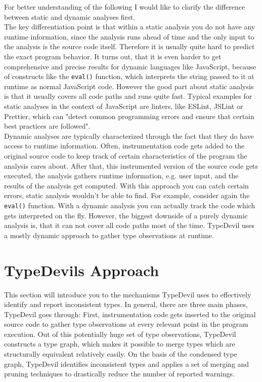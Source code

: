 \documentclass[runningheads,a4paper]{llncs}
\begin{document}
For better understanding of the following I would like to clarify the difference between static and dynamic analyses first.\\
The key differentiation point is that within a static analysis you do not have any runtime information, since the analysis runs ahead of time and the only input to the analysis is the source code itself.
Therefore it is usually quite hard to predict the exact program behavior.
It turns out, that it is even harder to get comprehensive and precise results for dynamic languages like JavaScript, because of constructs like the \lstinline[columns=fixed]{eval()} function, which interprets the string passed to it at runtime as normal JavaScript code. 
However the good part about static analysis is that it usually covers all code paths and runs quite fast.
Typical examples for static analyses in the context of JavaScript are linters, like ESLint, JSLint or Prettier, which can "detect common programming errors and ensure that certain best practices are followed". \\
Dynamic analyses are typically characterized through the fact that they do have access to runtime information.
Often, instrumentation code gets added to the original source code to keep track of certain characteristics of the program the analysis cares about.
After that, this instrumented version of the source code gets executed, the analysis gathers runtime information, e.g. user input, and the results of the analysis get computed.
With this approach you can catch certain errors, static analysis wouldn't be able to find.
For example, consider again the \lstinline[columns=fixed]{eval()} function.
With a dynamic analysis you can actually track the code which gets interpreted on the fly.
However, the biggest downside of a purely dynamic analysis is, that it can not cover all code paths most of the time.
TypeDevil uses a mostly dynamic approach to gather type observations at runtime.

\section{TypeDevils Approach}

This section will introduce you to the mechanisms TypeDevil uses to effectively identify and report inconsistent types.
In general, there are three main phases, TypeDevil goes through: 
First, instrumentation code gets inserted to the original source code to gather type observations at every relevant point in the program execution.
Out of this potentially huge set of type observations, TypeDevil constructs a type graph, which makes it possible to merge types which are structurally equivalent relatively easily.
On the basis of the condensed type graph, TypeDevil identifies inconsistent types and applies a set of merging and pruning techniques to drastically reduce the number of reported warnings.
\end{document}
